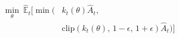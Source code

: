 %
\begin{equation} \label{eqn:PPO_clip}
\begin{aligned}
    \min_\theta\ \hat{\mathbb{E}}_t [\min(&k_t(\theta)\hat{A}_t,\,\\
    &\text{clip}(k_t(\theta),\, 1-\epsilon,\, 1+\epsilon)\hat{A}_t)]
\end{aligned}
\end{equation}

